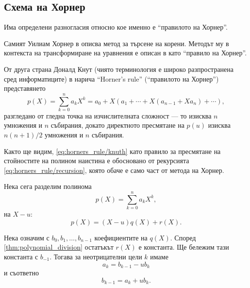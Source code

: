\documentclass{../../common/topic}
\begin{document}
\subsection{Схема на Хорнер}

\begin{remark}
  Има определени разногласия относно кое именно е \enquote{правилото на Хорнер}.

  Самият Уилиам Хорнер в \cite{Horner1819SolvingNumericalEquations} описва метод за търсене на корени. Методът му в контекста на трансформиране на уравнения е описан в \cite[\S III.V.2]{Обрешков1962ВисшаАлгебра} като \enquote{правило на Хорнер}.

  От друга страна Доналд Кнут (чиято терминология е широко разпространена сред информатиците) в \cite[486]{Knuth1997ArtVol2} нарича \enquote{Horner's rule} (\enquote{правилото на Хорнер}) представянето
  \begin{equation}\label{eq:horners_rule/knuth}
    p(X) = \sum_{k=0}^n a_k X^k = a_0 + X (a_1 + \cdots + X(a_{n-1} + X a_n) + \cdots),
  \end{equation}
  разгледано от гледна точка на изчислителната сложност --- то изисква \( n \) умножения и \( n \) събирания, докато директното пресмятане на \( p(u) \) изисква \( {n(n+1)} / 2 \) умножения и \( n \) събирания.

  Както ще видим, \eqref{eq:horners_rule/knuth} като правило за пресмятане на стойностите на полином наистина е обосновано от рекурсията \eqref{eq:horners_rule/recursion}, която обаче е само част от метода на Хорнер.
\end{remark}

Нека сега разделим полинома
\begin{equation*}
  p(X) = \sum_{k=0}^n a_k X^k,
\end{equation*}
на \( X - u \):
\begin{equation*}
  p(X) = (X - u) q(X) + r(X).
\end{equation*}

Нека означим с \( b_0, b_1, \ldots, b_{n - 1} \) коефициентите на \( q(X) \). Според \cref{thm:polynomial_division} остатъкът \( r(X) \) е константа. Ще бележим тази константа с \( b_{-1} \). Тогава за неотрицателни цели \( k \) имаме
\begin{equation*}
  a_k = b_{k-1} - u b_k
\end{equation*}
и съответно
\begin{equation*}
  b_{k-1} = a_k + u b_k.
\end{equation*}
\end{document}
